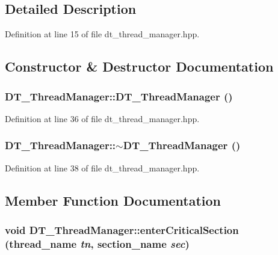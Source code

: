 \subsection{Detailed Description}


Definition at line 15 of file dt\_\-thread\_\-manager.hpp.

\subsection{Constructor \& Destructor Documentation}
\hypertarget{class_d_t___thread_manager_a86af9f88b74723e4beb11a2712fc886e}{
\subsubsection[{DT\_\-ThreadManager}]{\setlength{\rightskip}{0pt plus 5cm}DT\_\-ThreadManager::DT\_\-ThreadManager ()}}
\label{class_d_t___thread_manager_a86af9f88b74723e4beb11a2712fc886e}


Definition at line 36 of file dt\_\-thread\_\-manager.hpp.\hypertarget{class_d_t___thread_manager_a61ffab6d5cb0f849ddd3d2520fd69977}{
\subsubsection[{$\sim$DT\_\-ThreadManager}]{\setlength{\rightskip}{0pt plus 5cm}DT\_\-ThreadManager::$\sim$DT\_\-ThreadManager ()}}
\label{class_d_t___thread_manager_a61ffab6d5cb0f849ddd3d2520fd69977}


Definition at line 38 of file dt\_\-thread\_\-manager.hpp.

\subsection{Member Function Documentation}
\hypertarget{class_d_t___thread_manager_a1890fa094ae872fb2ce0fb15a97447ee}{
\subsubsection[{enterCriticalSection}]{\setlength{\rightskip}{0pt plus 5cm}void DT\_\-ThreadManager::enterCriticalSection ({\bf thread\_\-name} {\em tn}, \/  {\bf section\_\-name} {\em sec})}}
\label{class_d_t___thread_manager_a1890fa094ae872fb2ce0fb15a97447ee}



